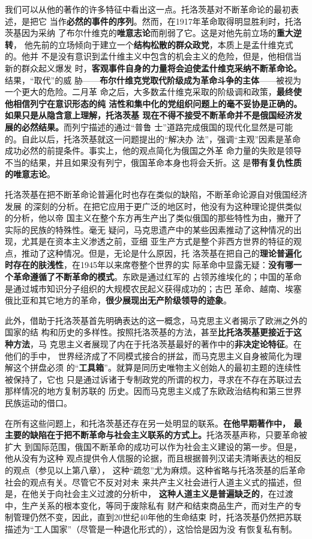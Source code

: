 我们可以从他的著作的许多特征中看出这一点。托洛茨基对不断革命论的最初表述，是把它
当作\textbf{必然的事件的序列}。然而，在1917年革命取得明显胜利时，托洛茨基因为采纳
了布尔什维克的\textbf{唯意志论}而削弱了它。这是对他先前立场的\textbf{重大逆转}，
他先前的立场倾向于建立一个\textbf{结构松散的群众政党}，本质上是孟什维克式的。他并
不是没有意识到孟什维主义中包含的机会主义的危险，但是，他相信当新的群众起义爆发
时，\textbf{客观事件自身的力量将会迫使孟什维克采纳不断革命论。}结果，“取代”的威
胁——\textbf{布尔什维克党取代阶级成为革命斗争的主体}——被视为一个更大的危险。二月革
命之后，大多数孟什维克采取的阶级调和政策，\textbf{最终使他相信列宁在意识形态的纯
  洁性和集中化的党组织问题上的毫不妥协是正确的。如果只是从隐含意上理解，托洛茨基
  现在不得不接受不断革命并不是俄国经济发展的必然结果。}而列宁描述的通过“普鲁
士”道路完成俄国的现代化显然是可能的。自此以后，托洛茨基就这一问题提出的“解决办
法”，强调“主观”因素是革命成功必然的前提条件。事实上，他的观点简化为俄国之外革
命力量的失败是领导不当的结果，并且如果没有列宁，俄国革命本身也将会夭折。这
是\textbf{带有复仇性质的唯意志论}。

托洛茨基在把不断革命论普遍化时也存在类似的缺陷，不断革命论源自对俄国经济发展
的深刻的分析。在把它应用于更广泛的地区时，他没有为这种理论提供类似的分析，他以帝
国主义在整个东方再生产出了类似俄国的那些特性为由，撇开了实际的民族的特殊性。毫无
疑问，马克思遗产中的某些因素推动了这种情况的出现，尤其是在资本主义渗透之前，亚细
亚生产方式是整个非西方世界的特征的观点，推动了这种情况。但是，无论是什么原因，托
洛茨基在把自己的\textbf{理论普遍化时存在的肤浅性}，在1945年以来席卷整个世界的实
际革命中显露无疑：\textbf{没有哪一个革命遵循了不断革命的模式}。东欧是通过红军的
占领苏维埃化的；中国的革命是通过城市知识分子组织的大规模农民起义获得成功的；古巴
革命、越南、埃塞俄比亚和其它地方的革命，\textbf{很少展现出无产阶级领导的迹象}。

此外，借助于托洛茨基首先明确表达的这一概念，马克思主义者揭示了欧洲之外的国家的结
构和历史的多样性。按照托洛茨基的方法，甚至\textbf{比托洛茨基更接近于这种方法}，马
克思主义者展现了内在于托洛茨基最好的著作中的\textbf{非决定论特征}。在他们的手中，
世界经济成了不同模式接合的拼盆，而马克思主义自身被简化为理解这个拼盘必须
的“\textbf{工具箱}”。就算是同历史唯物主义创始人的最初主题的连续性被保持了，它也
只是通过诉诸于专制政党的所谓的权力，寻求在不存在苏联过去那样情况的地方复制苏联的
历史。因而马克思主义成了东欧政治结构和第三世界民族运动的借口。

在所有这些问题上，和托洛茨基还存在另一处明显的联系。\textbf{在他早期著作中，
最主要的缺陷在于把不断革命与社会主义联系的方式上。}托洛茨基声称，只要革命被扩大
到国际范围，俄国不断革命的成功可以作为社会主义建设的第一步。但是，他从没有为这种
观点提供令人信服的论据，而且根据普列汉诺夫清晰表达的相反的观点（参见以上第八章），
这种“疏忽”尤为麻烦。这种省略与托洛茨基的后革命社会的观点有关。尽管它不反对对未
来共产主义社会进行人道主义式的描述，但是，在他关于向社会主义过渡的分析中，
\textbf{这种人道主义是普遍缺乏的}，在过渡中，生产关系的根本变化，等同于废除私有
财产和结束商品生产，而对生产的专制管理仍然不变，因此，直到20世纪40年他的生命结束
时，托洛茨基仍然把苏联描述为“工人国家”（尽管是一种退化形式的），这恰恰是因为没
有恢复私有制。

